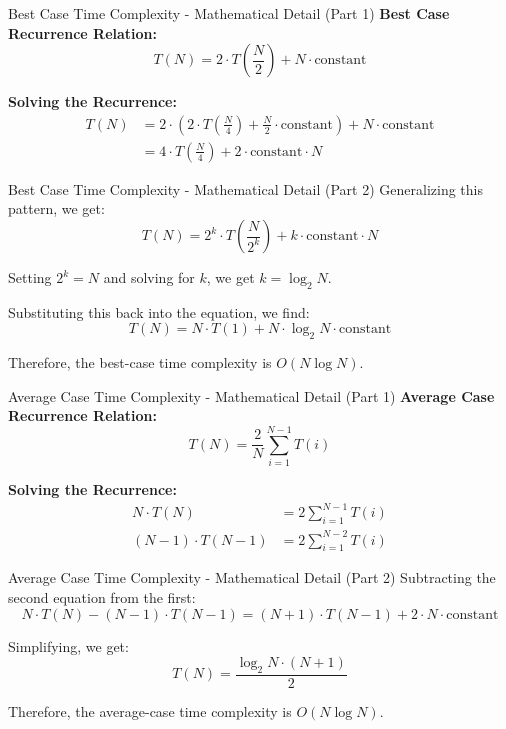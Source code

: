 \begin{frame}{Best Case Time Complexity - Mathematical Detail (Part 1)}
    \textbf{Best Case Recurrence Relation:}
    \[ T(N) = 2 \cdot T\left(\frac{N}{2}\right) + N \cdot \text{constant} \]

    \textbf{Solving the Recurrence:}
    \begin{align*}
        T(N) &= 2 \cdot \left(2 \cdot T\left(\frac{N}{4}\right) + \frac{N}{2} \cdot \text{constant}\right) + N \cdot \text{constant} \\
        &= 4 \cdot T\left(\frac{N}{4}\right) + 2 \cdot \text{constant} \cdot N
    \end{align*}
\end{frame}
\begin{frame}{Best Case Time Complexity - Mathematical Detail (Part 2)}
    Generalizing this pattern, we get:
    \[ T(N) = 2^k \cdot T\left(\frac{N}{2^k}\right) + k \cdot \text{constant} \cdot N \]

    Setting \(2^k = N\) and solving for \(k\), we get \(k = \log_2 N\).

    Substituting this back into the equation, we find:
    \[ T(N) = N \cdot T(1) + N \cdot \log_2 N \cdot \text{constant} \]

    Therefore, the best-case time complexity is \(O(N \log N)\).
\end{frame}
\begin{frame}{Average Case Time Complexity - Mathematical Detail (Part 1)}
    \textbf{Average Case Recurrence Relation:}
    \[ T(N) = \frac{2}{N} \sum_{i=1}^{N-1} T(i) \]

    \textbf{Solving the Recurrence:}
    \begin{align*}
        N \cdot T(N) &= 2 \sum_{i=1}^{N-1} T(i) \\
        (N-1) \cdot T(N-1) &= 2 \sum_{i=1}^{N-2} T(i)
    \end{align*}
\end{frame}
\begin{frame}{Average Case Time Complexity - Mathematical Detail (Part 2)}
    Subtracting the second equation from the first:
    \[ N \cdot T(N) - (N-1) \cdot T(N-1) = (N + 1) \cdot T(N-1) + 2 \cdot N \cdot \text{constant} \]

    Simplifying, we get:
    \[ T(N) = \frac{\log_2 N \cdot (N + 1)}{2} \]

    Therefore, the average-case time complexity is \(O(N \log N)\).
\end{frame}
